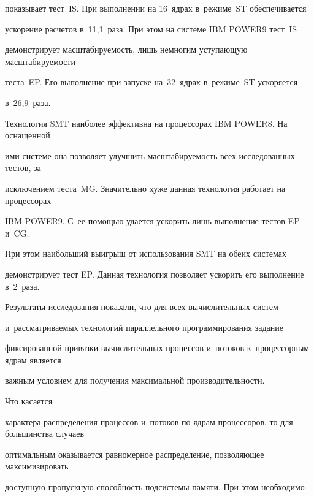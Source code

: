 показывает тест~IS. При выполнении на 16~ядрах в~режиме~ST обеспечивается 


ускорение расчетов в~11,1~раза. При этом на системе IBM POWER9 тест~IS 


демонстрирует масштабируемость, лишь немногим уступающую масштабируемости 


теста~EP. Его выполнение при запуске на~32~ядрах в~режиме~ST ускоряется 


в~26,9~раза.





Технология SMT наиболее эффективна на процессорах IBM POWER8. На оснащенной 


ими системе она позволяет улучшить масштабируемость всех исследованных тестов, за 


исключением теста~MG. Значительно хуже данная технология работает на процессорах 


IBM POWER9. С~ее помощью удается ускорить лишь выполнение тестов EP и~CG. 


При этом наибольший выигрыш от использования SMT на обеих системах 


демонстрирует тест EP. Данная технология позволяет ускорить его выполнение в~2~раза.





Результаты исследования показали, что для всех вычислительных систем 


и~рассматриваемых технологий параллельного программирования задание 


фиксированной привязки вычислительных процессов и~потоков к~процессорным ядрам является 


важным условием для получения максимальной производительности. 








Что касается 


характера распределения процессов и~потоков по ядрам процессоров, то для большинства случаев 


оптимальным оказывается равномерное распределение, поз\-во\-ля\-ющее максимизировать 


доступную пропускную спо\-соб\-ность под\-сис\-те\-мы памяти. При этом необходимо 


